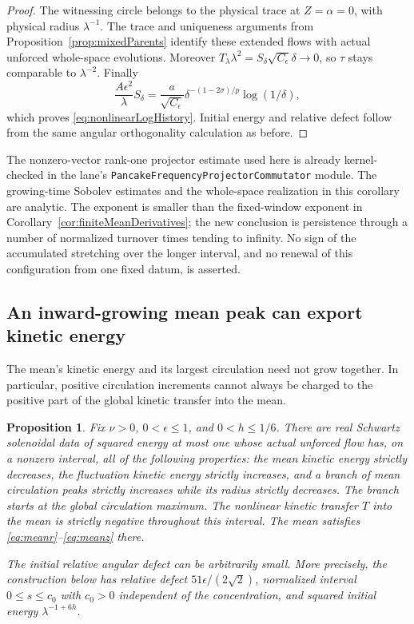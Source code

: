 \documentclass[11pt]{article}
\newtheorem{proposition}[theorem]{Proposition}
\theoremstyle{remark}
\begin{document}
\begin{proof}
The witnessing circle belongs to the physical trace at $Z=\alpha=0$,
with physical radius $\lambda^{-1}$. The trace and uniqueness arguments
from Proposition~\ref{prop:mixedParents} identify these extended flows
with actual unforced whole-space evolutions. Moreover
$T_\lambda\lambda^2=S_\delta\sqrt{C_\epsilon}\delta\to0$,
so $\tau$ stays comparable to $\lambda^{-2}$. Finally
\[
 \frac{A\epsilon^2}{\lambda}S_\delta
   =\frac{a}{\sqrt{C_\epsilon}}
       \delta^{-(1-2\sigma)/p}\log(1/\delta),
\]
which proves \eqref{eq:nonlinearLogHistory}. Initial energy and
relative defect follow from the same angular orthogonality calculation
as before.
\end{proof}

The nonzero-vector rank-one projector estimate used here is already
kernel-checked in the lane's
\texttt{PancakeFrequencyProjectorCommutator} module. The growing-time
Sobolev estimates and the whole-space realization in this corollary are
analytic. The exponent is smaller than the fixed-window exponent in
Corollary~\ref{cor:finiteMeanDerivatives}; the new conclusion is persistence
through a number of normalized turnover times tending to infinity.
No sign of the accumulated stretching over the longer interval, and no
renewal of this configuration from one fixed datum, is asserted.

\subsection{An inward-growing mean peak can export kinetic energy}

The mean's kinetic energy and its largest circulation need not grow
together. In particular, positive circulation increments cannot always
be charged to the positive part of the global kinetic transfer into
the mean.

\begin{proposition}\label{prop:exportingMeanPeak}
Fix $\nu>0$, $0<\epsilon\leq1$, and $0<h\leq1/6$.
There are real Schwartz solenoidal data of squared energy at most one
whose actual unforced flow has, on a nonzero interval, all of the
following properties: the mean kinetic energy strictly decreases,
the fluctuation kinetic energy strictly increases, and a branch of
mean circulation peaks strictly increases while its radius strictly
decreases. The branch starts at the global circulation maximum.
The nonlinear kinetic transfer $T$ into the mean is strictly negative
throughout this interval. The mean satisfies
\eqref{eq:meanr}--\eqref{eq:meanz} there.

The initial relative angular defect can be arbitrarily small.
More precisely, the construction below has relative defect
$51\epsilon/(2\sqrt2)$, normalized interval $0\leq s\leq c_0$
with $c_0>0$ independent of the concentration, and squared initial
energy $\lambda^{-1+6h}$.
\end{proposition}
\end{document}
